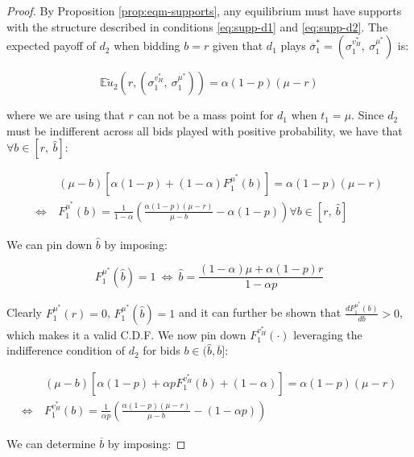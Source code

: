 \begin{proof}
\noindent By Proposition \ref{prop:eqm-supports}, any equilibrium must have supports with the structure described in conditions \ref{eq:supp-d1} and \ref{eq:supp-d2}. The expected payoff of $ d_2 $ when bidding $ b = r $ given that $ d_1 $ plays $ \overline{\sigma}_1^* = \left( \sigma_1^{v_H^*},\ \sigma_1^{\mu^*} \right) $ is:

\begin{equation*}
    \mathbb{E}\tilde{u}_2 \left(r, \left(\sigma_1^{v_H^*},\ \sigma_1^{\mu^*} \right) \right) = \alpha (1 - p) (\mu - r)
\end{equation*}

\noindent where we are using that $ r $ can not be a mass point for $ d_1 $ when $ t_1 = \mu $. Since $ d_2 $ must be indifferent across all bids played with positive probability, we have that $ \forall b \in [r,\ \hat{b}] $:

\begin{align*}
    & (\mu - b) \left[ \alpha (1 - p) + (1 - \alpha) F_1^{\mu^*}(b) \right] = \alpha (1 - p) (\mu - r) \\[8pt]
    \iff \ & F_1^{\mu^*}(b) = \frac{1}{1 - \alpha} \left( \frac{\alpha (1 - p)(\mu - r)}{\mu - b} - \alpha (1 - p) \right)  \forall b \in [r,\ \hat{b}]
\end{align*}

\noindent We can pin down $ \hat{b} $ by imposing:

\begin{equation*}
     F_1^{\mu^*}(\hat{b}) = 1 \ \iff \ \hat{b} = \frac{(1 - \alpha) \mu + \alpha (1 - p) r}{1 - \alpha p}
\end{equation*}

\noindent Clearly $ F_1^{\mu^*}(r) = 0 $, $ F_1^{\mu^*}(\hat{b}) = 1 $ and it can further be shown that $\frac{d F_1^{\mu^*}(b)}{db} > 0 $, which makes it a valid C.D.F. We now pin down $ F_1^{v_H^*}(\cdot) $ leveraging the indifference condition of $ d_2 $ for bids $ b \in (\hat{b},\overline{b}] $:

\begin{align*}
    & (\mu - b) \left[ \alpha(1 - p) + \alpha p F_1^{v_H^*}(b) + (1 - \alpha)  \right] = \alpha (1 - p) (\mu -r) \\[8pt]
    \iff \ & F_1^{v_H^*}(b) = \frac{1}{\alpha p} \left( \frac{\alpha (1 - p)(\mu - r)}{\mu - b} - (1 - \alpha p) \right)
\end{align*}

\noindent We can determine $ \overline{b} $ by imposing:


\end{proof}
